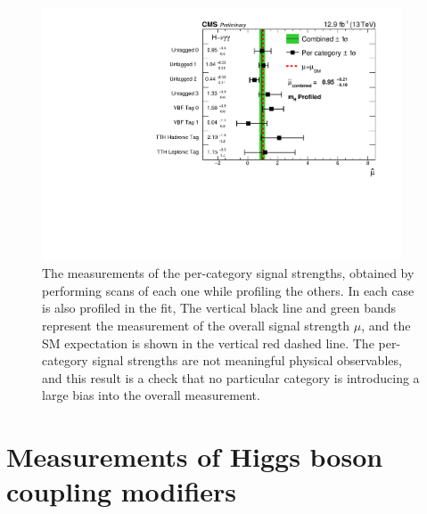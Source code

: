 \begin{figure}[ht!]
\centering
\includegraphics[width=0.95\textwidth]{statandresultsFigures/PerTagChannelCompatibilityProfileMH.pdf} 
\caption{The measurements of the per-category signal strengths, obtained by performing \DNLL scans of each one while profiling the others. In each case \mH is also profiled in the fit, The vertical black line and green bands represent the measurement of the overall signal strength $\mu$, and the SM expectation is shown in the vertical red dashed line. The per-category signal strengths are not meaningful physical observables, and this result is a check that no particular category is introducing a large bias into the overall measurement.}

\label{fig:statandresults:mu_per_tag}

\end{figure}

\section{Measurements of Higgs boson coupling modifiers}
\label{sec:statandresults:kappas}

